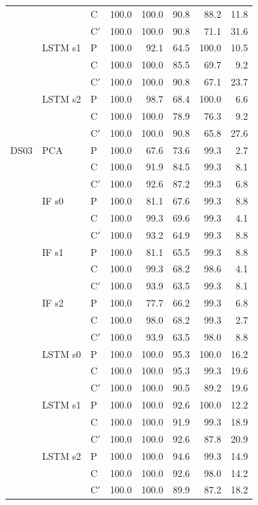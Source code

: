 \begin{scriptsize}
\begin{longtable}{lllrrrrr}
 &  & C & 100.0 & 100.0 & 90.8 & 88.2 & 11.8 \\
 &  & C$'$ & 100.0 & 100.0 & 90.8 & 71.1 & 31.6 \\
 & LSTM s1 & P & 100.0 & 92.1 & 64.5 & 100.0 & 10.5 \\
 &  & C & 100.0 & 100.0 & 85.5 & 69.7 & 9.2 \\
 &  & C$'$ & 100.0 & 100.0 & 90.8 & 67.1 & 23.7 \\
 & LSTM s2 & P & 100.0 & 98.7 & 68.4 & 100.0 & 6.6 \\
 &  & C & 100.0 & 100.0 & 78.9 & 76.3 & 9.2 \\
 &  & C$'$ & 100.0 & 100.0 & 90.8 & 65.8 & 27.6 \\
\midrule
DS03 & PCA & P & 100.0 & 67.6 & 73.6 & 99.3 & 2.7 \\
 &  & C & 100.0 & 91.9 & 84.5 & 99.3 & 8.1 \\
 &  & C$'$ & 100.0 & 92.6 & 87.2 & 99.3 & 6.8 \\
 & IF s0 & P & 100.0 & 81.1 & 67.6 & 99.3 & 8.8 \\
 &  & C & 100.0 & 99.3 & 69.6 & 99.3 & 4.1 \\
 &  & C$'$ & 100.0 & 93.2 & 64.9 & 99.3 & 8.8 \\
 & IF s1 & P & 100.0 & 81.1 & 65.5 & 99.3 & 8.8 \\
 &  & C & 100.0 & 99.3 & 68.2 & 98.6 & 4.1 \\
 &  & C$'$ & 100.0 & 93.9 & 63.5 & 99.3 & 8.1 \\
 & IF s2 & P & 100.0 & 77.7 & 66.2 & 99.3 & 6.8 \\
 &  & C & 100.0 & 98.0 & 68.2 & 99.3 & 2.7 \\
 &  & C$'$ & 100.0 & 93.9 & 63.5 & 98.0 & 8.8 \\
 & LSTM s0 & P & 100.0 & 100.0 & 95.3 & 100.0 & 16.2 \\
 &  & C & 100.0 & 100.0 & 95.3 & 99.3 & 19.6 \\
 &  & C$'$ & 100.0 & 100.0 & 90.5 & 89.2 & 19.6 \\
 & LSTM s1 & P & 100.0 & 100.0 & 92.6 & 100.0 & 12.2 \\
 &  & C & 100.0 & 100.0 & 91.9 & 99.3 & 18.9 \\
 &  & C$'$ & 100.0 & 100.0 & 92.6 & 87.8 & 20.9 \\
 & LSTM s2 & P & 100.0 & 100.0 & 94.6 & 99.3 & 14.9 \\
 &  & C & 100.0 & 100.0 & 92.6 & 98.0 & 14.2 \\
 &  & C$'$ & 100.0 & 100.0 & 89.9 & 87.2 & 18.2 \\
\end{longtable}
\end{scriptsize}
